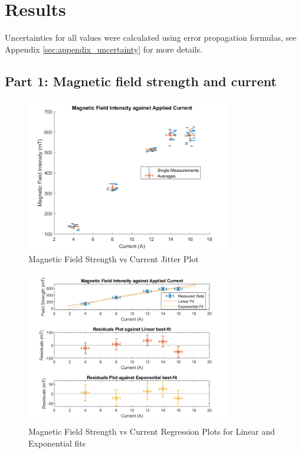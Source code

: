 

\section{Results}
Uncertainties for all values were calculated using error propagation formulas, see Appendix \ref{sec:appendix_uncertainty} for more details.
\subsection{Part 1: Magnetic field strength and current}

\begin{figure}
    \centering
    \includegraphics[width=0.8\textwidth]{Results/Figures/Magnetic_Field_vs_Current_jitter.png}
    \caption{Magnetic Field Strength vs Current Jitter Plot}
    \label{fig:magnetic_field_vs_current_jitter}
\end{figure}
\begin{figure}
    \centering
    \includegraphics[width=0.8\textwidth]{Results/Figures/Magnetic_Field_vs_Current.png}
    \caption{Magnetic Field Strength vs Current Regression Plots for Linear and Exponential fits}
    \label{fig:magnetic_field_vs_current}
\end{figure}
